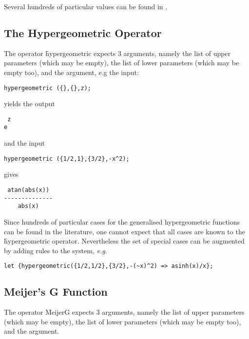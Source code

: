 Several hundreds of particular values can be found in \cite{Prudnikov:90c}.

\hypertarget{HYPERGEOMETRIC}{}
\subsection{The Hypergeometric Operator}

The operator \f{hypergeometric} expects 3 arguments, namely the 
list of upper parameters (which may be empty), the list of lower
parameters (which may be empty too), and the argument, e.g the input:
\begin{verbatim}
hypergeometric ({},{},z);
\end{verbatim}
yields the output
\begin{verbatim}
 z
e
\end{verbatim}
and the input
\begin{verbatim}
hypergeometric ({1/2,1},{3/2},-x^2);
\end{verbatim}
gives
\begin{verbatim}
 atan(abs(x))
--------------
    abs(x)
\end{verbatim}


Since hundreds of particular cases for the generalised hypergeometric
functions can be found in the literature, one cannot expect that all
cases are known to the \f{hypergeometric} operator.
Nevertheless the set of special cases can be augmented by adding
rules to the \REDUCE{} system, {\em e.g.}
\begin{verbatim}
let {hypergeometric({1/2,1/2},{3/2},-(~x)^2) => asinh(x)/x};
\end{verbatim}

\subsection{Meijer's G Function}
\hypertarget{MEIJERG}{}

The operator \f{MeijerG} expects 3 arguments, namely the 
list of upper parameters (which may be empty), the list of lower
parameters (which may be empty too), and the argument.

